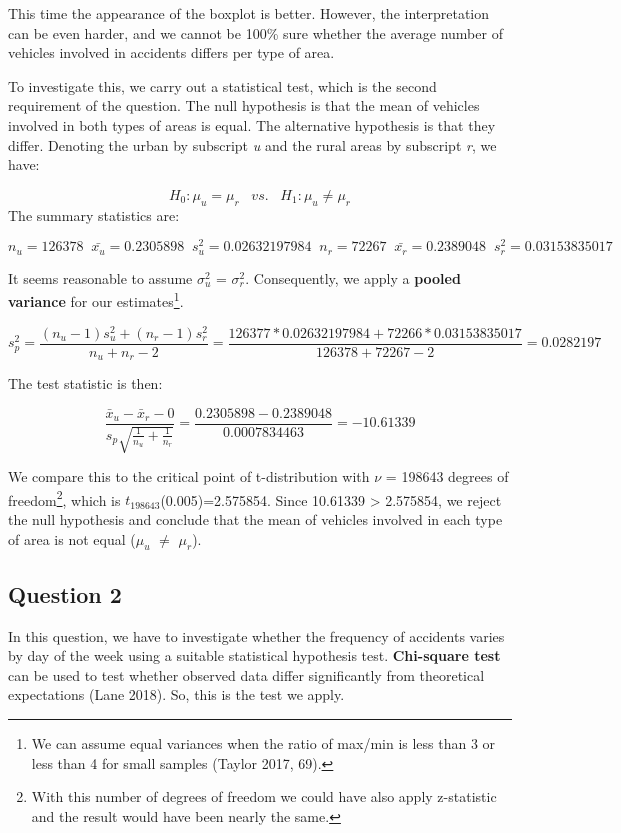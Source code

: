 \documentclass[]{article}
\let\rmarkdownfootnote\footnote%
\def\footnote{\protect\rmarkdownfootnote}
\begin{document}
This time the appearance of the boxplot is better. However, the
interpretation can be even harder, and we cannot be 100\% sure whether
the average number of vehicles involved in accidents differs per type of
area.

To investigate this, we carry out a statistical test, which is the
second requirement of the question. The null hypothesis is that the mean
of vehicles involved in both types of areas is equal. The alternative
hypothesis is that they differ. Denoting the urban by subscript \emph{u}
and the rural areas by subscript \emph{r}, we have:

\[H_{0}: \mu_{u} = \mu_{r}\;\;\;vs.\;\;\;H_{1}: \mu_{u} \neq \mu_{r}\]
The summary statistics are:

\[n_{u}=126378\;\;\bar{x_{u}}=0.2305898\;\;s_{u}^{2}=0.02632197984\;\;n_{r}=72267\;\;\bar{x_{r}}=0.2389048\;\;s_{r}^{2}=0.03153835017\]

It seems reasonable to assume \(\sigma_{u}^{2}\) = \(\sigma_{r}^{2}\).
Consequently, we apply a \textbf{pooled variance} for our
estimates\footnote{We can assume equal variances when the ratio of
  max/min is less than 3 or less than 4 for small samples (Taylor 2017,
  69).}.

\[s_{p}^{2}=\frac{(n_{u}-1)s_{u}^{2}+(n_{r}-1)s_{r}^{2}}{n_{u}+n_{r}-2} = \frac{126377*0.02632197984+72266*0.03153835017}{126378+72267-2}=0.0282197\]

The test statistic is then:

\[\frac{\bar x_{u}-\bar x_{r}-0}{s_{p}\sqrt{\frac{1}{n_{u}}+\frac{1}{n_{r}}}}=\frac{0.2305898-0.2389048}{0.0007834463}=-10.61339\]

We compare this to the critical point of t-distribution with \(\nu\) =
198643 degrees of freedom\footnote{With this number of degrees of
  freedom we could have also apply z-statistic and the result would have
  been nearly the same.}, which is \(t_{198643}\)(0.005)=2.575854. Since
\textbar{}10.61339\textbar{} \textgreater{} 2.575854, we reject the null
hypothesis and conclude that the mean of vehicles involved in each type
of area is not equal (\(\mu_{u}\) \(\neq\) \(\mu_{r}\)).

\subsection{Question 2}\label{question-2}

In this question, we have to investigate whether the frequency of
accidents varies by day of the week using a suitable statistical
hypothesis test. \textbf{Chi-square test} can be used to test whether
observed data differ significantly from theoretical expectations (Lane
2018). So, this is the test we apply.
\end{document}
